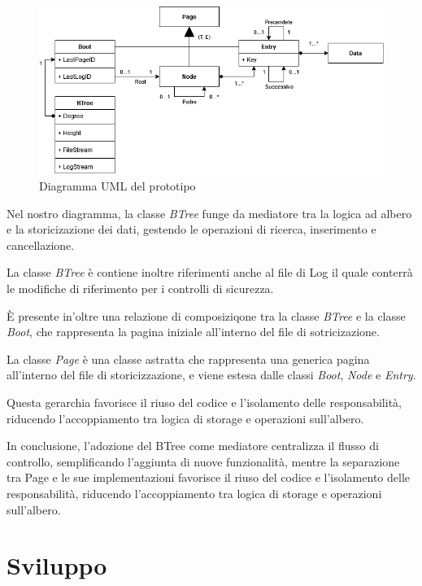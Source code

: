 \documentclass[12pt,a4paper,openright,twoside]{book}
\begin{document}
            \begin{figure} [h]
                \centering
                \includegraphics[width=1\linewidth]{figures/UML.png}
                \caption{Diagramma UML del prototipo}
                \label{fig:uml}
            \end{figure}

            Nel nostro diagramma, la classe \textit{BTree} funge da mediatore tra la logica ad albero e la storicizazione dei dati, gestendo le operazioni di ricerca, inserimento e cancellazione.

            La classe \textit{BTree} è contiene inoltre riferimenti anche al file di Log il quale conterrà le modifiche di riferimento per i controlli di sicurezza.

            È presente in'oltre una relazione di composiziqone tra la classe \textit{BTree} e la classe \textit{Boot}, che rappresenta la pagina iniziale all'interno del file di sotricizazione.

            La classe \textit{Page} è una classe astratta che rappresenta una generica pagina all'interno del file di storicizzazione, e viene estesa dalle classi \textit{Boot}, \textit{Node} e \textit{Entry}.

            Questa gerarchia favorisce il riuso del codice e l’isolamento delle responsabilità, riducendo l’accoppiamento tra logica di storage e operazioni sull’albero.

            In conclusione, l’adozione del BTree come mediatore centralizza il flusso di controllo, semplificando l’aggiunta di nuove funzionalità, mentre la separazione tra Page e le sue implementazioni favorisce il riuso del codice e l’isolamento delle responsabilità, riducendo l’accoppiamento tra logica di storage e operazioni sull’albero.

    \section{Sviluppo}
\end{document}
